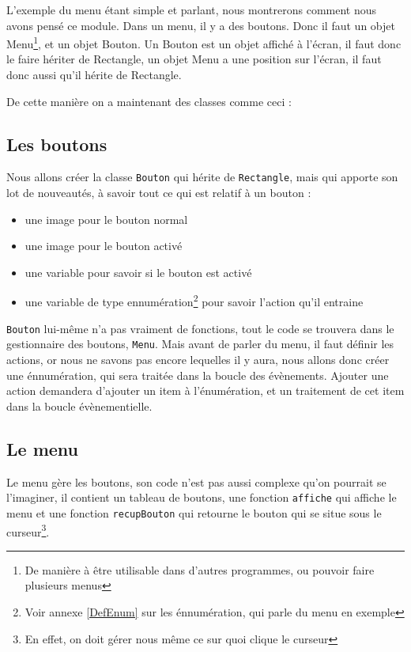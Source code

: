 
L'exemple du menu étant simple et parlant, nous montrerons comment nous avons pensé 
ce module. Dans un menu, il y a des boutons. Donc il faut un objet Menu\footnote{De manière à être 
utilisable dans d'autres programmes, ou pouvoir faire plusieurs menus}, et un objet Bouton. Un Bouton est un objet affiché à l'écran, il faut donc le faire hériter de Rectangle, un objet Menu a une position sur l'écran, il faut donc aussi qu'il hérite de Rectangle.

De cette manière on a maintenant des classes comme ceci :

  
\subsection{Les boutons}
	Nous allons créer la classe \texttt{Bouton} qui hérite de \texttt{Rectangle}, mais qui apporte son lot de nouveautés, à savoir tout ce qui est relatif à un bouton : 
	\begin{itemize}
		\item une image pour le bouton normal
		\item une image pour le bouton activé
		\item une variable pour savoir si le bouton est activé
		\item une variable de type ennumération\footnote{Voir annexe \ref{DefEnum} sur les énnumération, qui parle du menu en exemple} pour savoir l'action qu'il entraine
	\end{itemize}
	
	\texttt{Bouton} lui-même n'a pas vraiment de fonctions, tout le code se trouvera dans le gestionnaire des boutons, \texttt{Menu}. Mais avant de parler du menu, il faut définir les actions, or nous ne savons pas encore lequelles il y aura, nous allons donc créer une énnumération, qui sera traitée dans la boucle des évènements. Ajouter une action demandera d'ajouter un item à l'énumération, et un traitement de cet item dans la boucle évènementielle.
	
\subsection{Le menu}
	Le menu gère les boutons, son code n'est pas aussi complexe qu'on pourrait se l'imaginer, il contient un tableau de boutons, une fonction \texttt{affiche} qui affiche le menu et une fonction \texttt{recupBouton} qui retourne le bouton qui se situe sous le curseur\footnote{En effet, on doit gérer nous même ce sur quoi clique le curseur}.
	
